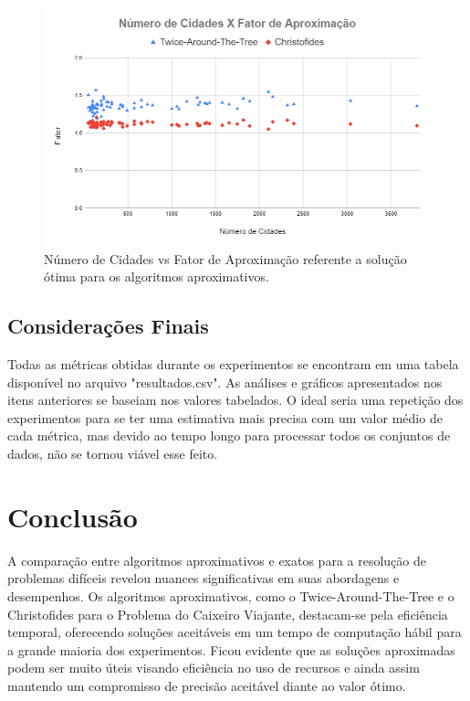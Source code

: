 \documentclass[12pt]{article}
\begin{document}
\begin{figure}[ht]
\centering
\includegraphics[width=\textwidth]{Quality.png}
\caption{Número de Cidades vs Fator de Aproximação referente a solução ótima para os algoritmos aproximativos.}
\label{fig:quality}
\end{figure}

\subsection{Considerações Finais}

Todas as métricas obtidas durante os experimentos se encontram em uma tabela disponível no arquivo "resultados.csv". As análises e gráficos apresentados nos itens anteriores se baseiam nos valores tabelados. O ideal seria uma repetição dos experimentos para se ter uma estimativa mais precisa com um valor médio de cada métrica, mas devido ao tempo longo para processar todos os conjuntos de dados, não se tornou viável esse feito.


\section{Conclusão}

A comparação entre algoritmos aproximativos e exatos para a resolução de problemas difíceis revelou nuances significativas em suas abordagens e desempenhos. Os algoritmos aproximativos, como o Twice-Around-The-Tree e o Christofides para o Problema do Caixeiro Viajante, destacam-se pela eficiência temporal, oferecendo soluções aceitáveis em um tempo de computação hábil para a grande maioria dos experimentos. Ficou evidente que as soluções aproximadas podem ser muito úteis visando eficiência no uso de recursos e ainda assim mantendo um compromisso de precisão aceitável diante ao valor ótimo.
\end{document}
